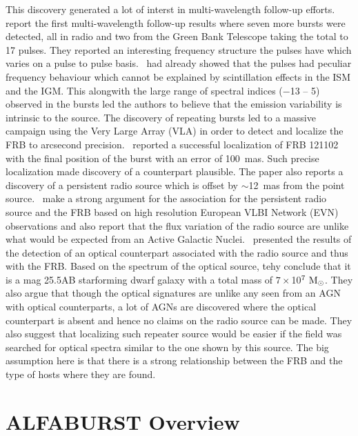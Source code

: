 \documentclass[a4paper,fleqn,usenatbib]{mnras}
\begin{document}
 This discovery generated a lot of interst in multi-wavelength
follow-up efforts.~\cite{2016ApJ...833..177S} report the first multi-wavelength
follow-up results where seven more bursts were detected, all in radio and two
from the Green Bank Telescope taking the total to 17 pulses. They reported an interesting frequency structure the pulses have which varies on a pulse to pulse basis.~\cite{2016Natur.531..202S} had already showed that the
pulses had peculiar frequency behaviour which cannot be explained by
scintillation effects in the ISM and the IGM. This alongwith the large range
of spectral indices ($-$13 -- 5) observed in the bursts led the authors to
believe that the emission variability is intrinsic to the source. The
discovery of repeating bursts led to a massive campaign using the Very Large
Array (VLA) in order to detect and localize the FRB to arcsecond precision.~\cite{2017Natur.541...58C} reported a successful localization of FRB 121102 with
the final position of the burst with an error of 100~mas. Such
precise localization made discovery of a counterpart plausible. The paper also
reports a discovery of a persistent radio source which is offset by $\sim$12~mas from the point source.~\cite{2017ApJ...834L...8M} make a strong argument for the association for the persistent radio source and the FRB based on high resolution European VLBI Network (EVN) observations and also report that the flux variation of the radio source are
unlike what would be expected from an Active Galactic Nuclei.~\cite{2017ApJ...834L...7T} presented the results of the detection of an optical counterpart associated
with the radio source and thus with the FRB. Based on the spectrum of the
optical source, tehy conclude that it is a mag 25.5AB starforming dwarf
galaxy with a total mass of $7 \times$10$^{7}~\rm M_{\odot}$. They also argue that though the optical signatures are unlike any seen
from an AGN with optical counterparts, a lot of AGNs are discovered where the optical counterpart is
absent and hence no claims
on the radio source can be made. They also suggest that localizing such
repeater source would be easier if the field was searched for optical spectra
similar to the one shown by this source. The big assumption here is that there
is a strong relationship between the FRB and the type of hosts where they are
found.

\section{ALFABURST Overview}
\end{document}
